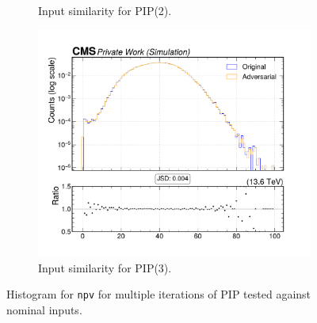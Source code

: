 \begin{figure}[htbp]
\begin{subfigure}[t]{0.32\textwidth}
    \caption{Input similarity for PIP(2).}
  \end{subfigure}\hfill
  \begin{subfigure}[t]{0.32\textwidth}
    \includegraphics[width=\linewidth]{media/output/features/compare/intprob_3/cmp_global_features_npv.pdf}
    \caption{Input similarity for PIP(3).}
  \end{subfigure}

  \caption{Histogram for \texttt{npv} for multiple iterations of PIP tested against nominal inputs.}
  \label{fig:intprob_input_npv}
\end{figure}
